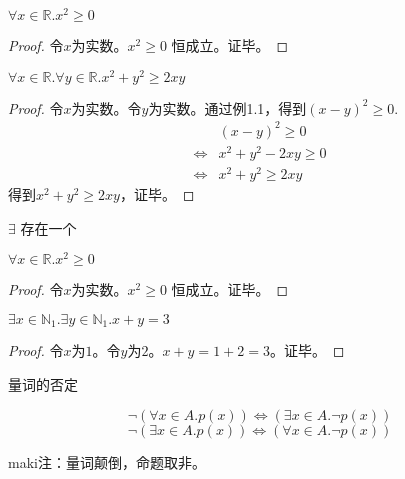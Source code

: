 \begin{example}
    $\forall x \in \mathbb{R}. x^2 \ge 0$
\end{example}

\begin{proof}
令$x$为实数。$x^2 \ge 0$ 恒成立。证毕。
\end{proof}


\begin{example}
    $\forall x \in \mathbb{R}. \forall y \in \mathbb{R}. x^2 + y^2 \ge 2xy$
\end{example}

\begin{proof}
令$x$为实数。令$y$为实数。通过例1.1，得到$(x-y)^2 \ge 0$.
\begin{equation}
    \begin{split}
        & (x-y)^2 \ge 0 \\
        \iff & x^2 + y^2 - 2xy \ge 0 \\
        \iff & x^2 + y^2 \ge 2xy
    \end{split}
\end{equation}
得到$x^2 + y^2 \ge 2xy$，证毕。
\end{proof}

$\exists$ 存在一个

\begin{example}
    $\forall x \in \mathbb{R}. x^2 \ge 0$
\end{example}

\begin{proof}
令$x$为实数。$x^2 \ge 0$ 恒成立。证毕。
\end{proof}

\begin{example}
    $\exists x \in \mathbb{N}_1. \exists y \in \mathbb{N}_1. x + y = 3$
\end{example}

\begin{proof}
令$x$为$1$。令$y$为$2$。$x + y = 1 + 2 = 3$。证毕。
\end{proof}

量词的否定

\begin{equation}
    \neg (\forall x \in A. p(x)) \iff (\exists x \in A. \neg p(x))
\end{equation}
\begin{equation}
    \neg (\exists x \in A. p(x)) \iff (\forall x \in A. \neg p(x))
\end{equation}

maki注：量词颠倒，命题取非。

